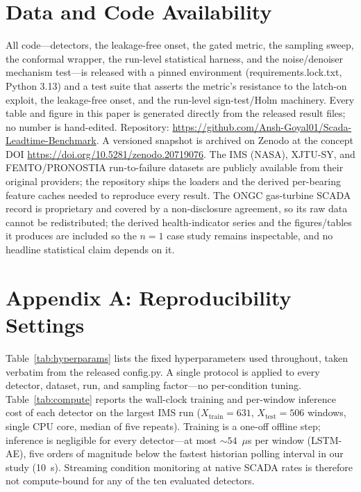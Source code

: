 \documentclass[IJPHM, 2026, 0]{PHMSociety}
\begin{document}
\section*{Data and Code Availability}
All code---detectors, the leakage-free onset, the gated metric, the sampling sweep, the conformal wrapper, the run-level statistical harness, and the noise/denoiser mechanism test---is released with a pinned environment (requirements.lock.txt, Python 3.13) and a test suite that asserts the metric's resistance to the latch-on exploit, the leakage-free onset, and the run-level sign-test/Holm machinery. Every table and figure in this paper is generated directly from the released result files; no number is hand-edited. Repository: \url{https://github.com/Ansh-Goyal01/Scada-Leadtime-Benchmark}. A versioned snapshot is archived on Zenodo at the concept DOI \url{https://doi.org/10.5281/zenodo.20719076}. The IMS (NASA), XJTU-SY, and FEMTO/PRONOSTIA run-to-failure datasets are publicly available from their original providers; the repository ships the loaders and the derived per-bearing feature caches needed to reproduce every result. The ONGC gas-turbine SCADA record is proprietary and covered by a non-disclosure agreement, so its raw data cannot be redistributed; the derived health-indicator series and the figures/tables it produces are included so the $n=1$ case study remains inspectable, and no headline statistical claim depends on it.





\FloatBarrier
\section*{Appendix A: Reproducibility Settings}
Table~\ref{tab:hyperparams} lists the fixed hyperparameters used throughout, taken verbatim from the released config.py. A single protocol is applied to every detector, dataset, run, and sampling factor---no per-condition tuning. Table~\ref{tab:compute} reports the wall-clock training and per-window inference cost of each detector on the largest IMS run ($X_{\text{train}}=631$, $X_{\text{test}}=506$ windows, single CPU core, median of five repeats). Training is a one-off offline step; inference is negligible for every detector---at most ${\sim}54$~$\mu$s per window (LSTM-AE), five orders of magnitude below the fastest historian polling interval in our study (10~s). Streaming condition monitoring at native SCADA rates is therefore not compute-bound for any of the ten evaluated detectors.
\end{document}
